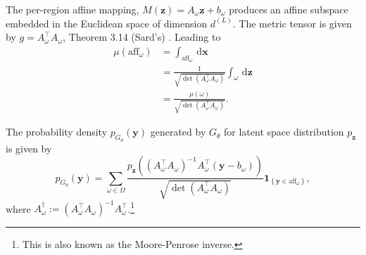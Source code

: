 \begin{tproof}
    The per-region affine mapping, $M(\mathbf{z})=A_{\omega}\mathbf{z}+b_{\omega}$ produces an affine subspace embedded in the Euclidean space of dimension $d^{(L)}$. The metric tensor is given by $g=A_{\omega}^\top A_{\omega}$, Theorem 3.14 (Sard's) \citet{spivakCalculusManifoldsModern1965}. Leading to
    \begin{align*}
        \mu\left(\mathrm{aff}_{\omega}\right)&=\int_{\mathrm{aff}_{\omega}}\,\mathrm{d}\mathbf{x}\\&=\frac{1}{\sqrt{\det\left(A_{\omega}^\top A_{\omega}\right)}}\int_{\omega}\,\mathrm{d}\mathbf{z}\\&=\frac{\mu(\omega)}{\sqrt{\det\left(A_{\omega}^\top A_{\omega}\right)}}.
    \end{align*}
\end{tproof}

\begin{theorem}\label{thm:density_generated_manifold}
    The probability density $p_{G_{\theta}}(\mathbf{y})$ generated by $G_{\theta}$ for latent space distribution $p_{\mathbf{z}}$ is given by $$p_{G_{\theta}}(\mathbf{y})=\sum_{\omega\in\Omega}\frac{p_{\mathbf{z}}\left(\left(A_{\omega}^\top A_{\omega}\right)^{-1}A_{\omega}^\top\left(\mathbf{y}-b_{\omega}\right)\right)}{\sqrt{\det\left(A_{\omega}^\top A_{\omega}\right)}}\mathbf{1}_{\left\{\mathbf{y}\in\mathrm{aff}_{\omega}\right\}},$$where $A_{\omega}^{\dagger}:=\left(A_{\omega}^\top A_{\omega}\right)^{-1}A_{\omega}^\top$.\footnote{This is also known as the Moore-Penrose inverse.}
\end{theorem}

